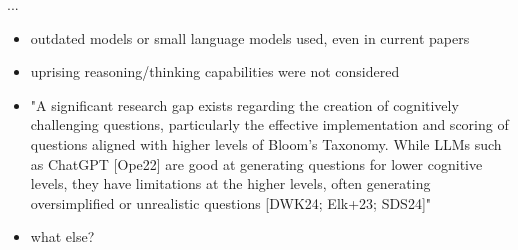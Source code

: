  ...



\begin{itemize}
    \item outdated models or small language models used, even in current papers
    \item uprising reasoning/thinking capabilities were not considered
    \item "A significant research gap exists regarding the creation of
cognitively challenging questions, particularly the effective implementation and scoring of questions
aligned with higher levels of Bloom's Taxonomy. While LLMs such as ChatGPT [Ope22] are good
at generating questions for lower cognitive levels, they have limitations at the higher levels, often
generating oversimplified or unrealistic questions [DWK24; Elk+23; SDS24]"
    \item what else?
\end{itemize}